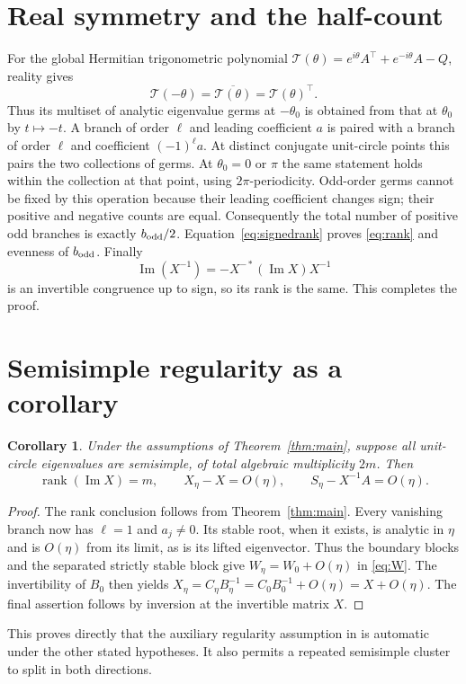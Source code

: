 \documentclass[11pt]{article}
\newtheorem{corollary}[theorem]{Corollary}
\newcommand{\Ima}{\operatorname{Im}}
\newcommand{\rank}{\operatorname{rank}}
\begin{document}
\section{Real symmetry and the half-count}
For the global Hermitian trigonometric polynomial
$\mathcal T(\theta)=e^{i\theta}A^\top+e^{-i\theta}A-Q$, reality gives
\[
\mathcal T(-\theta)=\overline{\mathcal T(\theta)}=\mathcal T(\theta)^\top.
\]
Thus its multiset of analytic eigenvalue germs at $-\theta_0$ is obtained from that
at $\theta_0$ by $t\mapsto-t$. A branch of order $\ell$ and leading coefficient $a$
is paired with a branch of order $\ell$ and coefficient $(-1)^\ell a$.
At distinct conjugate unit-circle points this pairs the two collections of germs.
At $\theta_0=0$ or $\pi$ the same statement holds within the collection at that point,
using $2\pi$-periodicity. Odd-order germs cannot be fixed by this operation because their
leading coefficient changes sign; their positive and negative counts are equal.
Consequently the total number of positive odd branches is exactly $b_{\rm odd}/2$.
Equation~\eqref{eq:signedrank} proves \eqref{eq:rank} and evenness of $b_{\rm odd}$.
Finally
\[
\Ima(X^{-1})=-X^{-*}(\Ima X)X^{-1}
\]
is an invertible congruence up to sign, so its rank is the same. This completes the proof.

\section{Semisimple regularity as a corollary}
\begin{corollary}\label{cor:semisimple}
Under the assumptions of Theorem~\ref{thm:main}, suppose all unit-circle eigenvalues are
semisimple, of total algebraic multiplicity $2m$. Then
\[
\rank(\Ima X)=m,\qquad X_\eta-X=O(\eta),\qquad S_\eta-X^{-1}A=O(\eta).
\]
\end{corollary}
\begin{proof}
The rank conclusion follows from Theorem~\ref{thm:main}.
Every vanishing branch now has $\ell=1$ and $a_j\ne0$.
Its stable root, when it exists, is analytic in $\eta$ and is $O(\eta)$ from its limit,
as is its lifted eigenvector. Thus the boundary blocks and the separated strictly stable
block give $W_\eta=W_0+O(\eta)$ in \eqref{eq:W}.
The invertibility of $B_0$ then yields
$X_\eta=C_\eta B_\eta^{-1}=C_0B_0^{-1}+O(\eta)=X+O(\eta)$.
The final assertion follows by inversion at the invertible matrix $X$.
\end{proof}
This proves directly that the auxiliary regularity assumption in
\cite[Theorem~3.3(ii)]{GKL} is automatic under the other stated hypotheses.
It also permits a repeated semisimple cluster to split in both directions.
\end{document}
